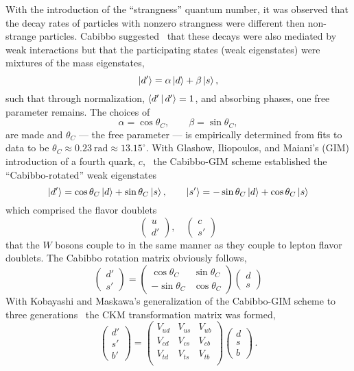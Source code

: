 With the introduction of the ``strangness'' quantum number, it was observed that the decay rates of particles with nonzero strangness were different then non-strange particles.
Cabibbo suggested~\cite{Cabibbo:1963yz} that these decays were also mediated by weak interactions but that the participating states (weak eigenstates) were mixtures of the mass eigenstates,
\[
 \Ket{d'} = \alpha \Ket{d} + \beta \Ket{s},
\]
such that through normalization, $\Braket{d'|d'} = 1$, and absorbing phases, one free parameter remains.
The choices of
\[
 \alpha = \cos\theta_C, \qquad \beta = \sin\theta_C,
\]
are made and $\theta_C$ --- the free parameter --- is empirically determined from fits to data to be $\theta_C \approx 0.23~\mathrm{rad} \approx 13.15^{\circ}$.
With Glashow, Iliopoulos, and Maiani's (GIM) introduction of a fourth quark, $c$,~\cite{Glashow:1970gm} the Cabibbo-GIM scheme established the ``Cabibbo-rotated'' weak eigenstates
\[
 \Ket{d'} = \cos\theta_C \Ket{d} + \sin\theta_C \Ket{s}, \qquad \Ket{s'} = -\sin\theta_C \Ket{d} + \cos\theta_C \Ket{s}
\]
which comprised the flavor doublets
\[
 \begin{pmatrix}
  u \\d'
 \end{pmatrix}, \quad
 \begin{pmatrix}
  c \\s'
 \end{pmatrix}
\]
that the $W$ bosons couple to in the same manner as they couple to lepton flavor doublets.
The Cabibbo rotation matrix obviously follows,
\[
 \begin{pmatrix}
  d' \\ s'
 \end{pmatrix}
 =
 \begin{pmatrix}
  \cos\theta_C & \sin\theta_C \\ -\sin\theta_C & \cos\theta_C
 \end{pmatrix}
 \begin{pmatrix}
  d \\ s
 \end{pmatrix}
\]
With Kobayashi and Maskawa's generalization of the Cabibbo-GIM scheme to three generations~\cite{Kobayashi:1973fv} the CKM transformation matrix was formed,
\[
 \begin{pmatrix}
  d' \\ s'\\ b'
 \end{pmatrix}
 =
 \begin{pmatrix}
  V_{ud} & V_{us} & V_{ub} \\
  V_{cd} & V_{cs} & V_{cb} \\
  V_{td} & V_{ts} & V_{tb} \\
 \end{pmatrix}
 \begin{pmatrix}
  d \\ s\\ b
 \end{pmatrix}\,.
\]
